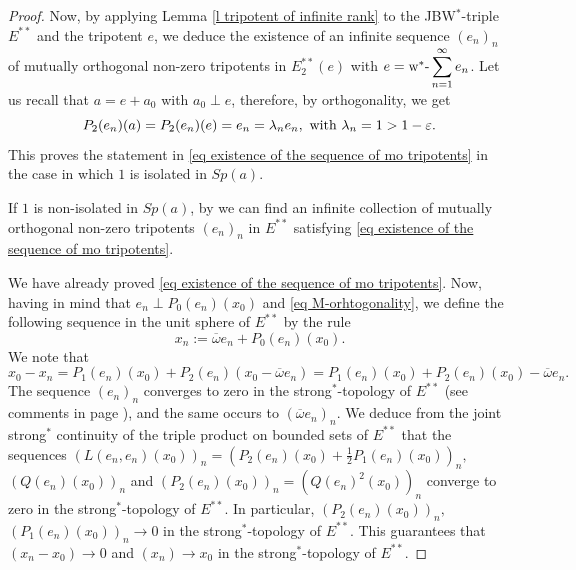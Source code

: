 \documentclass[10pt]{amsart}
\begin{document}
\begin{proof}
		
		Now, by applying Lemma \ref{l tripotent of infinite rank} to the JBW$^*$-triple $E^{**}$ and the tripotent $e$, we deduce the existence of an infinite sequence $(e_n)_n$ of mutually orthogonal non-zero tripotents in $E_2^{**}(e)$ with $\displaystyle e = \hbox{w$^*$-}\sum_{n=1} ^{\infty} e_n $. Let us recall that $a = e + a_0$ with $a_0\perp e$, therefore, by orthogonality, we get $$P_2(e_n) (a) = P_2(e_n) (e) = e_n = \lambda_n e_n, \hbox{ with }  \lambda_n = 1 > 1-\varepsilon.$$ This proves the statement in \eqref{eq existence of the sequence of mo tripotents} in the case in which $1$ is isolated in $Sp(a)$.
		
		If $1$ is non-isolated in $Sp(a)$, by \cite[Proposition 3.6]{ArKaup} we can find an infinite collection of mutually orthogonal non-zero tripotents $(e_n)_n$ in $E^{**}$ satisfying \eqref{eq existence of the sequence of mo tripotents}.
		
		We have already proved \eqref{eq existence of the sequence of mo tripotents}. Now, having in mind that $e_n \perp P_0 (e_n) (x_0)$ and \eqref{eq M-orhtogonality}, we define the following sequence in the unit sphere of $E^{**}$ by the rule $$x_n := \overline{\omega} e_n + P_0 (e_n) (x_0).$$ We note that $$x_0- x_n  = P_1(e_n) (x_0) + P_2(e_n) (x_0-  \overline{\omega} e_n) = P_1(e_n) (x_0) + P_2(e_n) (x_0) -  \overline{\omega} e_n.$$ The sequence $(e_n)_n$ converges to zero in the strong$^*$-topology of $E^{**}$ (see comments in page \pageref{eq orthogonal sequences are strong* null}), and the same occurs to $( \overline{\omega} e_n)_n$. We deduce from the joint strong$^*$ continuity of the triple product on bounded sets of $E^{**}$ that the sequences $(L(e_n,e_n)(x_0))_n = (P_2(e_n)(x_0) + \frac12 P_1(e_n) (x_0))_n,$ $(Q(e_n)(x_0))_n$ and $(P_2(e_n)(x_0))_n = (Q(e_n)^2(x_0))_n$ converge to zero in the strong$^*$-topology of $E^{**}$. In particular, $(P_2(e_n)(x_0))_n,$ $(P_1(e_n) (x_0))_n \longrightarrow 0$ in the strong$^*$-topology of $E^{**}$. This guarantees that $(x_n- x_0) \longrightarrow 0$ and $(x_n) \longrightarrow x_0$ in the strong$^*$-topology of $E^{**}$.
		

\end{proof}
\end{document}
